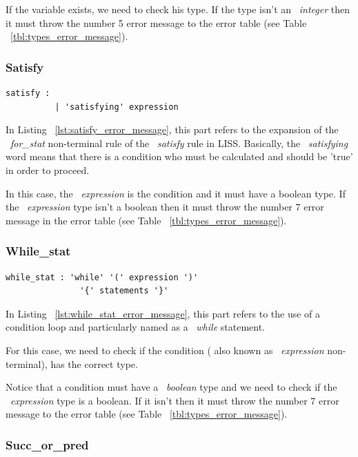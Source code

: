 \documentclass[
  oneside,
  11pt, a4paper,
  footinclude=true,
  headinclude=true,
  cleardoublepage=empty
]{scrbook}
\begin{document}
If the variable exists, we need to check his type. If the type isn't an ~\textit{integer} then it must throw the number 5 error message to the error table (see Table ~\ref{tbl:types_error_message}).

\subsubsection{Satisfy}

\begin{lstlisting}[caption={Satisfy rule in LISS},label={lst:satisfy_error_message}]
  satisfy :
          | 'satisfying' expression
\end{lstlisting}

In Listing ~\ref{lst:satisfy_error_message}, this part refers to the expansion of the ~\textit{for\_stat} non-terminal rule of the ~\textit{satisfy} rule in LISS.
Basically, the ~\textit{satisfying} word means that there is a condition who must be calculated and should be 'true' in order to proceed.

In this case, the ~\textit{expression} is the condition and it must have a boolean type. If the ~\textit{expression} type isn't a boolean then it must throw  the number 7 error message in the error table (see Table ~\ref{tbl:types_error_message}).

\subsubsection{While\_stat}

\begin{lstlisting}[caption={While\_stat rule in LISS},label={lst:while_stat_error_message}]
  while_stat : 'while' '(' expression ')' 
               '{' statements '}'
\end{lstlisting}

In Listing ~\ref{lst:while_stat_error_message}, this part refers to the use of a condition loop and particularly named as a ~\textit{while} statement.

For this case, we need to check if the condition ( also known as ~\textit{expression} non-terminal), has the correct type.

Notice that a condition must have a ~\textit{boolean} type and we need to check if the ~\textit{expression} type is a boolean. If it isn't then it must throw the number 7 error message to the error table (see Table ~\ref{tbl:types_error_message}).

\subsubsection{Succ\_or\_pred}
\end{document}
